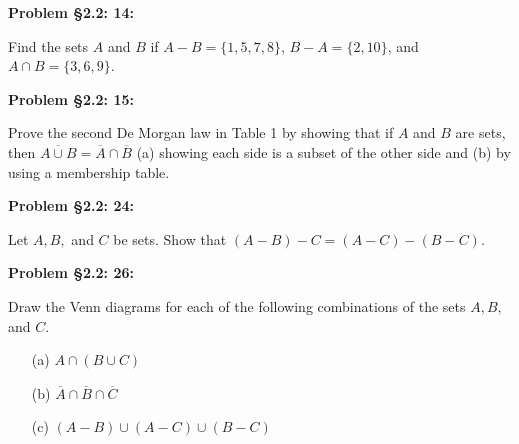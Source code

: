 \documentclass{article}
\newenvironment{problem}[1]
    {\begin{mdframed}[default]
    \textbf{Problem #1:}
    }
    {\end{mdframed}
    }
\begin{document}
\begin{problem}{\S 2.2: 14}
Find the sets $A$ and $B$ if $A - B = \{ 1, 5, 7, 8 \}$, $B-A = \{ 2, 10 \}$, and $A \cap B = \{ 3, 6, 9 \}$.
\end{problem}

\begin{problem}{\S 2.2: 15}
Prove the second De Morgan law in Table 1 by showing that if $A$ and $B$ are sets, then $\overline{A \cup B} = \overline{A} \cap \overline{B}$ (a) showing each side is a subset of the other side and (b) by using a membership table.
\end{problem}

\begin{problem}{\S 2.2: 24}
Let $A, B,$ and $C$ be sets. Show that $(A-B)-C = (A-C)-(B-C)$.
\end{problem}

\begin{problem}{\S 2.2: 26}
Draw the Venn diagrams for each of the following combinations of the sets $A,B,$ and $C$.
\begin{enumerate}
    \item[(a)] $A \cap (B \cup C)$
    \item[(b)] $\overline{A} \cap \overline{B} \cap \overline{C}$
    \item[(c)] $(A-B) \cup (A-C) \cup (B-C)$
\end{enumerate}
\end{problem}
\end{document}
